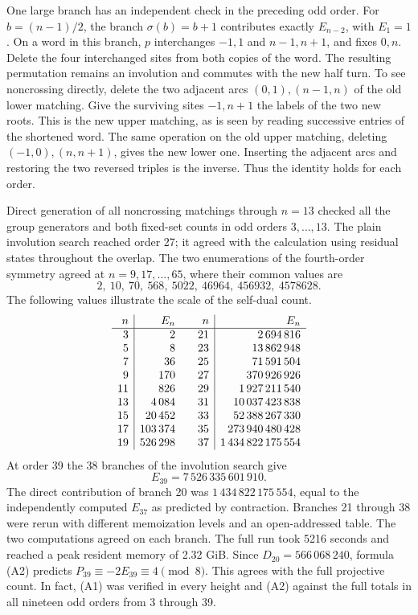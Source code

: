 One large branch has an independent check in the preceding odd
order. For \(b=(n-1)/2\), the branch \(\sigma(b)=b+1\) contributes
exactly \(E_{n-2}\), with \(E_1=1\). On a word in this branch,
\(p\) interchanges \(-1,1\) and \(n-1,n+1\), and fixes \(0,n\).
Delete the four interchanged sites from both copies of the word.
The resulting permutation remains an involution and commutes with
the new half turn. To see noncrossing directly, delete the two
adjacent arcs \((0,1),(n-1,n)\) of the old lower matching. Give
the surviving sites \(-1,n+1\) the labels of the two new roots.
This is the new upper matching, as is seen by reading successive
entries of the shortened word. The same operation on the old upper
matching, deleting \((-1,0),(n,n+1)\), gives the new lower one.
Inserting the adjacent arcs and restoring the two reversed triples
is the inverse. Thus the identity holds for each order.

Direct generation of all noncrossing matchings through \(n=13\)
checked all the group generators and both fixed-set counts in odd
orders \(3,\ldots,13\). The plain involution search reached order
27; it agreed with the calculation using residual states throughout
the overlap. The two enumerations of the fourth-order symmetry
agreed at \(n=9,17,\ldots,65\), where their common values are
\[
  2,\ 10,\ 70,\ 568,\ 5022,\ 46964,\ 456932,\ 4578628.
\]
The following values illustrate the scale of the self-dual count.
\[
\begin{array}{r|r@{\qquad}r|r}
n&E_n&n&E_n\\ \hline
 3&2&21&2\,694\,816\\
 5&8&23&13\,862\,948\\
 7&36&25&71\,591\,504\\
 9&170&27&370\,926\,926\\
11&826&29&1\,927\,211\,540\\
13&4\,084&31&10\,037\,423\,838\\
15&20\,452&33&52\,388\,267\,330\\
17&103\,374&35&273\,940\,480\,428\\
19&526\,298&37&1\,434\,822\,175\,554
\end{array}
\]
At order 39 the 38 branches of the involution search give
\[
 E_{39}=7\,526\,335\,601\,910.
\]
The direct contribution of branch 20 was \(1\,434\,822\,175\,554\),
equal to the independently computed \(E_{37}\) as predicted by
contraction. Branches 21 through 38 were rerun with different
memoization levels and an open-addressed table. The two computations
agreed on each branch. The full run took 5216 seconds and reached a
peak resident memory of 2.32 GiB.
Since \(D_{20}=566\,068\,240\), formula (A2) predicts
\(P_{39}\equiv-2E_{39}\equiv4\pmod8\). This agrees with the
full projective count. In fact, (A1) was verified in every height
and (A2) against the full totals in all nineteen odd orders from
3 through 39.
